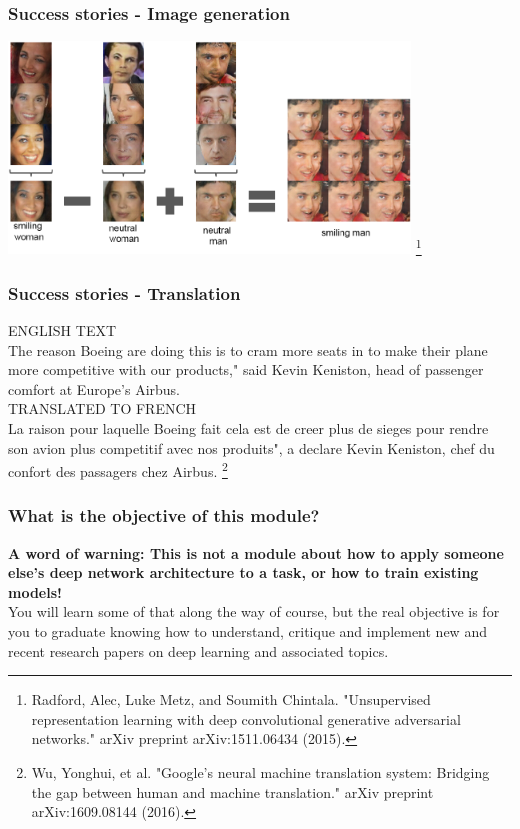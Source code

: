 \documentclass[\beamerclass]{beamer}
\newcommand\blfootnote[1]{%
  \begingroup
  \renewcommand\thefootnote{}\footnote{#1}%
  \addtocounter{footnote}{-1}%
  \endgroup
}
\begin{document}
\begin{frame}
	\frametitle{Success stories - Image generation}
	\centering \includegraphics[width=0.8\textwidth]{imggen.pdf}\blfootnote{Radford, Alec, Luke Metz, and Soumith Chintala. "Unsupervised representation learning with deep convolutional generative adversarial networks." arXiv preprint arXiv:1511.06434 (2015).}
\end{frame}

\begin{frame}
	\frametitle{Success stories - Translation}

ENGLISH TEXT\\
The reason Boeing are doing this is to cram more seats in to make their plane
more competitive with our products," said Kevin Keniston, head of passenger
comfort at Europe's Airbus.
\\[1em]
TRANSLATED TO FRENCH\\
La raison pour laquelle Boeing fait cela est de creer plus de sieges pour rendre
son avion plus competitif avec nos produits", a declare Kevin Keniston, chef
du confort des passagers chez Airbus. \blfootnote{Wu, Yonghui, et al. "Google's neural machine translation system: Bridging the gap between human and machine translation." arXiv preprint arXiv:1609.08144 (2016).}

\end{frame}

\begin{frame}
	\frametitle{What is the objective of this module?}
	
	\textbf{A word of warning: This is not a module about how to apply someone else's deep network architecture to a task, or how to train existing models!}
	\\[1em]
	You will learn some of that along the way of course, but the real objective is for you to graduate knowing how to understand, critique and implement new and recent research papers on deep learning and associated topics.
\end{frame}
\end{document}
